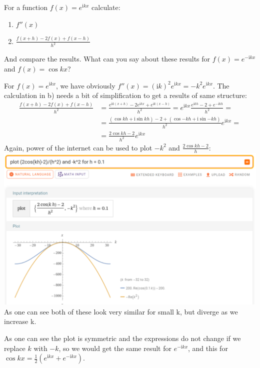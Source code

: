 \documentclass[12pt,class=article,crop=false,preview=false]{standalone}
\begin{document}
\begin{exercise}
For a function $f(x) = e^{\mathrm{i}kx}$ calculate:
\begin{enumerate}[label=\alph*)]
\item $f''(x)$
\item $\frac{f(x+h) - 2f(x) + f(x-h)}{h^2}$
\end{enumerate}
And compare the results. What can you say about these results for $f(x) = e^{-\mathrm{i}kx}$ and $f(x) = \cos{kx}$?
\end{exercise}
\newcommand{\im}{\mathrm{i}}
\begin{solution}
For $f(x) = e^{\im kx}$, we have obviously $f''(x) = (\im k)^2e^{\im kx} = -k^2e^{\im kx}$. The calculation in b) needs a bit of simplification to get a results of same structure:
\begin{align*}\frac{f(x+h) - 2f(x) + f(x-h)}{h^2}
&= \frac{e^{\im k(x+h)} - 2e^{\im kx}+e^{\im k(x-h)}}{h^2}= e^{\im kx}\frac{e^{\im kh}-2+e^{-\im kh}}{h^2} =\\
&= \frac{(\cos{kh}+\im\sin{kh})-2+(\cos{-kh}+\im\sin{-kh})}{h^2}e^{\im kx} =\\
&= \frac{2\cos{kh}-2}{h^2}e^{\im kx}
\end{align*}
Again, power of the internet can be used to plot $-k^2$ and $\frac{2\cos{kh}-2}{h}$:\\
\includegraphics[width=\textwidth]{img/plot1.png}
As one can see both of these look very similar for small k, but diverge as we increase k.

As one can see the plot is symmetric and the expressions do not change if we replace $k$ with $-k$, so we would get the same result for $e^{-\im kx}$, and this for $\cos kx = \frac{1}{2}\left(e^{\im kx} + e^{-\im kx}\right)$.
\end{solution}
\end{document}
